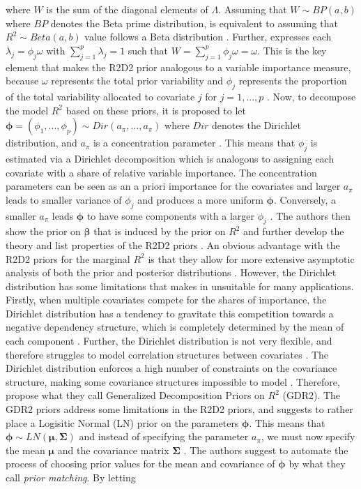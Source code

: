 where $W$ is the sum of the diagonal elements of $\Lambda$. Assuming that $W \sim BP(a, b)$ where $BP$ denotes the Beta prime distribution, is equivalent to assuming that $R^2 \sim Beta(a, b)$ value follows a Beta distribution \citep{zhang2020bayesian}. Further, \citet{zhang2020bayesian} expresses each $\lambda_j=\phi_j\omega$ with $\sum_{j=1}^p \lambda_j=1$ such that $W=\sum_{j=1}^p \phi_j\omega=\omega$. This is the key element that makes the R2D2 prior analogous to a variable importance measure, because $\omega$ represents the total prior variability and $\phi_j$ represents the proportion of the total variability allocated to covariate $j$ for $j=1, ..., p$ \citep{zhang2020bayesian}. Now, to decompose the model $R^2$ based on these priors, it is proposed to let $\boldsymbol{\phi}=(\phi_1, ..., \phi_p) \sim Dir(a_{\pi}, ..., a_{\pi})$ where $Dir$ denotes the Dirichlet distribution, and $a_{\pi}$ is a concentration parameter \citep{zhang2020bayesian}. This means that $\phi_j$ is estimated via a Dirichlet decomposition which is analogous to assigning each covariate with a share of relative variable importance. The concentration parameters can be seen as an a priori importance for the covariates \citep{aguilar2024generalized} and larger $a_{\pi}$ leads to smaller variance of $\phi_j$ and produces a more uniform $\boldsymbol{\phi}$. Conversely, a smaller $a_{\pi}$ leads $\boldsymbol{\phi}$ to have some components with a larger $\phi_j$ \citep{zhang2020bayesian}. The authors then show the prior on $\boldsymbol{\beta}$ that is induced by the prior on $R^2$ and further develop the theory and list properties of the R2D2 priors \citep{zhang2020bayesian}. An obvious advantage with the R2D2 priors for the marginal $R^2$ is that they allow for more extensive asymptotic analysis of both the prior and posterior distributions \citep{zhang2020bayesian}. However, the Dirichlet distribution has some limitations that makes in unsuitable for many applications. Firstly, when multiple covariates compete for the shares of importance, the Dirichlet distribution has a tendency to gravitate this competition towards a negative dependency structure, which is completely determined by the mean of each component \citep{aguilar2024generalized}. Further, the Dirichlet distribution is not very flexible, and therefore struggles to model correlation structures between covariates \citep[and references therein]{aguilar2024generalized}. The Dirichlet distribution enforces a high number of constraints on the covariance structure, making some covariance structures impossible to model \citep{aguilar2024generalized}. Therefore, \citet{aguilar2024generalized} propose what they call Generalized Decomposition Priors on $R^2$ (GDR2). The GDR2 priors address some limitations in the R2D2 priors, and suggests to rather place a Logisitic Normal (LN) prior on the parameters $\boldsymbol{\phi}$. This means that $\boldsymbol{\phi} \sim LN(\boldsymbol{\mu}, \boldsymbol{\Sigma})$ and instead of specifying the parameter $a_{\pi}$, we must now specify the mean $\boldsymbol{\mu}$ and the covariance matrix $\boldsymbol{\Sigma}$ \citep{aguilar2024generalized}. The authors suggest to automate the process of choosing prior values for the mean and covariance of $\boldsymbol{\phi}$ by what they call \textit{prior matching}. By letting 